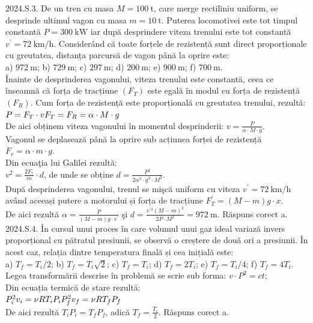 2024.S.3. De un tren cu masa $M=100 \mathrm{~t}$, care merge rectiliniu uniform, se desprinde ultimul vagon cu masa $m=10 \mathrm{~t}$. Puterea locomotivei este tot timpul constantă $P=300 \mathrm{~kW}$ iar după desprindere viteza trenului este tot constantă $v^{\prime}=72 \mathrm{~km} / \mathrm{h}$. Considerând că toate forțele de rezistență sunt direct proporționale cu greutatea, distanța parcursă de vagon până la oprire este:\\ a) $972 \mathrm{~m}$; b) $729 \mathrm{~m}$; c) $297 \mathrm{~m}$; d) $200 \mathrm{~m}$; e) $900 \mathrm{~m}$; f) $700 \mathrm{~m}$.\\ Înainte de desprinderea vagonului, viteza trenului este constantă, ceea ce înseamnă că forța de tracțiune $\left(F_{T}\right)$ este egală în modul cu forța de rezistență $\left(F_{R}\right)$. Cum forța de rezistență este proporțională cu greutatea trenului, rezultă:\\ $P=F_{T} \cdot v\\ F_{T}=F_{R}=\alpha \cdot M \cdot g$\\ De aici obținem viteza vagonului în momentul desprinderii: $v=\frac{P}{\alpha \cdot M \cdot g}$.\\ Vagonul se deplasează până la oprire sub acțiunea forței de rezistență\\ $F_{r}=\alpha \cdot m \cdot g$.\\ Din ecuaţia lui Galilei rezultă:\\ $v^{2}=\frac{2 F_{r}}{m} \cdot d$, de unde se obține $d=\frac{P^{2}}{2 \alpha^{3} \cdot g^{3} \cdot M^{2}}$.\\ După desprinderea vagonului, trenul se mişcă uniform cu viteza $v^{\prime}=72 \mathrm{~km} / \mathrm{h}$ având aceeași putere a motorului și forța de tracțiune $F_{T}^{\prime}=(M-m) g \cdot x$.\\ De aici rezultă $\alpha=\frac{P}{(M-m) g \cdot v^{\prime}}$ şi $d=\frac{v^{\prime 3}(M-m)^{3}}{2 P \cdot M^{2}}=972 \mathrm{~m}$. Răspuns corect a.\\

2024.S.4. În cursul unui proces în care volumul unui gaz ideal variază invers proporțional cu pătratul presiunii, se observă o creștere de două ori a presiunii. În acest caz, relația dintre temperatura finală și cea inițială este:\\ a) $T_{f}=T_{i} / 2$; b) $T_{f}=T_{i} \sqrt{2}$; c) $T_{f}=T_{i}$; d) $T_{f}=2 T_{i}$; e) $T_{f}=T_{i} / 4$; f) $T_{f}=4 T_{i}$.\\ Legea transformării descrise în problemă se scrie sub forma: $v \cdot P^{2}=c t$;\\ Din ecuația termică de stare rezultă:\\ $P_{i}^{2} v_{i}=\nu R T_{i} P_{i}\\ P_{f}^{2} v_{f}=\nu R T_{f} P_{f}$\\ De aici rezultă $T_{i} P_{i}=T_{f} P_{f}$, adică $T_{f}=\frac{T_{i}}{2}$. Răspuns corect a.\\

